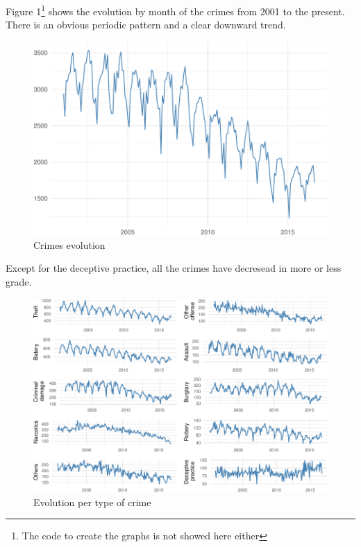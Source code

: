 \documentclass[]{article}
\let\rmarkdownfootnote\footnote%
\def\footnote{\protect\rmarkdownfootnote}
\begin{document}
Figure 1\footnote{The code to create the graphs is not showed here
  either} shows the evolution by month of the crimes from 2001 to the
present. There is an obvious periodic pattern and a clear downward
trend.

\begin{figure}[htbp]
\centering
\includegraphics{Assessment_1v9_files/figure-latex/fig-1.pdf}
\caption{Crimes evolution}
\end{figure}

Except for the deceptive practice, all the crimes have decresead in more
or less grade.

\begin{figure}[H]

{\centering \includegraphics{Assessment_1v9_files/figure-latex/fig2-1} 

}

\caption{Evolution per type of crime}\label{fig:fig2}
\end{figure}
\end{document}

